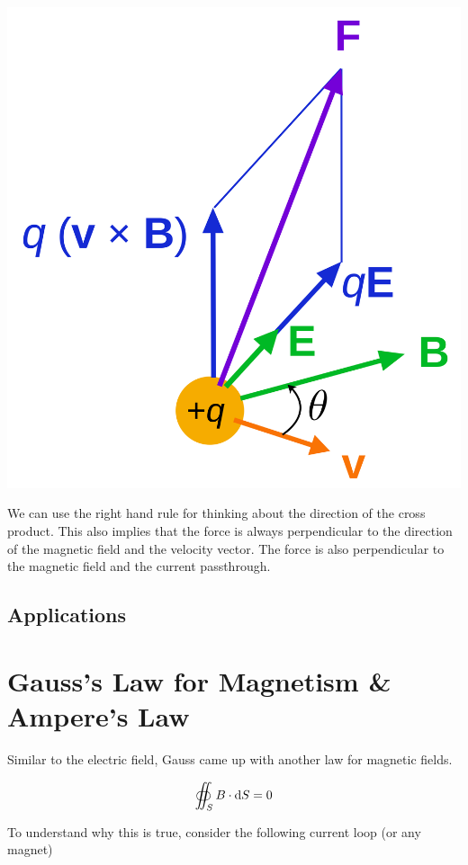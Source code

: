 \hfil \includegraphics[scale=0.075]{assets/lorentz-force.png}

We can use the right hand rule for thinking about the direction of the cross product. This also implies that the force is always perpendicular to the direction of the magnetic field and the velocity vector. The force is also perpendicular to the magnetic field and the current passthrough. 

\subsection{Applications}



\section[Laws of Magnetism]{Gauss's Law for Magnetism \& Ampere's Law}

Similar to the electric field, Gauss came up with another law for magnetic fields.

\[\oiint_S B\cdot\dif S = 0\]

To understand why this is true, consider the following current loop (or any magnet)

